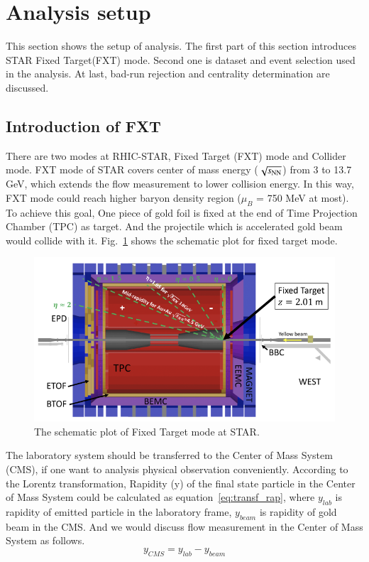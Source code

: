 
\section{Analysis setup}

This section shows the setup of analysis. 
The first part of this section introduces STAR Fixed Target(FXT) mode. 
Second one is dataset and event selection used in the analysis. 
At last, bad-run rejection and centrality determination are discussed.

\subsection{Introduction of FXT}

There are two modes at RHIC-STAR, Fixed Target (FXT) mode and Collider mode. 
FXT mode of STAR covers center of mass energy ($\sqrt{s_\text{NN}}$) from 3 to 13.7 GeV, which extends the flow measurement to lower collision energy.
In this way, FXT mode could reach higher baryon density region ($\mu_B$ = 750 MeV at most). 
To achieve this goal, One piece of gold foil is fixed at the end of Time Projection Chamber (TPC)\cite{PhysRevC.103.034908} as target.
And the projectile which is accelerated gold beam would collide with it. Fig.~\ref{fig:FXTmode} shows the schematic plot for fixed target mode.
\begin{figure}[hbt!]
\centering
\includegraphics[width=0.45\linewidth]{figures/chapter01/FXTmode.png}
\caption{The schematic plot of Fixed Target mode at STAR.}
\label{fig:FXTmode}
\end{figure}

The laboratory system should be transferred to the Center of Mass System (CMS), 
if one want to analysis physical observation conveniently. 
According to the Lorentz transformation, Rapidity (y) of the final state particle in the Center of Mass System could be calculated as equation~\ref{eq:transf_rap}, 
where $y_{lab}$ is rapidity of emitted particle in the laboratory frame, $y_{beam}$ is rapidity of gold beam in the CMS.
And we would discuss flow measurement in the Center of Mass System as follows.
\begin{equation}
    y_{CMS} = y_{lab} - y_{beam}
\label{eq:transf_rap}
\end{equation}

